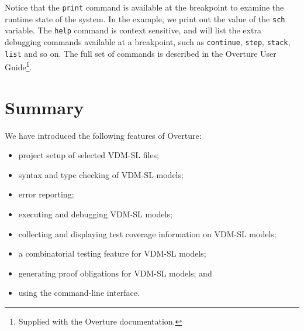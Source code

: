 \noindent Notice that the \verb|print| command is available at the breakpoint to examine the runtime state of the system. In the example, we print out the value of the \verb|sch| variable. The \verb|help|
command is context sensitive, and will list the extra debugging commands available at a breakpoint, such as \verb|continue|, \verb|step|, \verb|stack|, \verb|list| and so on. The full set of commands is described in the Overture User Guide\footnote{Supplied with the Overture documentation.}.

%
\lstset{style=mystyle}


\section{Summary}

We have introduced the following features of Overture:
%
\begin{itemize}
\item project setup of selected VDM-SL files;
\item syntax and type checking of VDM-SL models;
\item error reporting;
\item executing and debugging VDM-SL models; 
\item collecting and displaying test coverage information on VDM-SL
  models;
\item a combinatorial testing feature for VDM-SL models;
\item generating proof obligations for VDM-SL models; and
\item using the command-line interface. 
\end{itemize}
%

